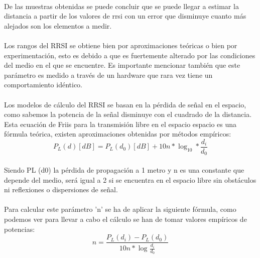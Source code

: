\documentclass[a4paper ,12pt, onecolumn]{article}
\begin{document}
            \paragraph{}
            De las muestras obtenidas se puede concluir que se puede llegar a estimar la distancia a partir de los valores
            de rrsi con un error que disminuye cuanto más alejados son los elementos a medir. 
            \paragraph{}
            Los rangos del RRSI se obtiene bien por aproximaciones teóricas o bien por experimentación, esto es debido a que 
            es fuertemente alterado por las condiciones del medio en el que se encuentre. Es importante mencionar también que
            este parámetro es medido a través de un hardware que rara vez tiene un comportamiento idéntico.
            \paragraph{}
            Los modelos de cálculo del RRSI se basan en la pérdida de señal en el espacio, como sabemos la potencia de la señal
            disminuye con el cuadrado de la distancia. Esta ecuación de Friis para la transmisión libre en el espacio espacio es 
            una fórmula teórica, existen aproximaciones obtenidas por métodos empíricos:
            \begin{equation}
                P_L(d) [dB] = P_L(d_0) [dB] + 10n*\log_{10}* \frac{ d_i }{d_0 } 
            \end{equation}
            \paragraph{}
            Siendo PL (d0)  la pérdida de propagación a 1 metro y n es una constante que depende del medio, será igual
            a 2 si se encuentra en el espacio libre sin obstáculos ni reflexiones o dispersiones de señal.
            \paragraph{}
            Para calcular este parámetro 'n' se ha de aplicar la siguiente fórmula, como podemos ver para llevar a cabo el 
            cálculo se han de tomar valores empíricos de potencias:
            \begin{equation}
                n = \frac{ P_L(d_i) - P_L(d_0) }{10n*\log_{}\frac{d_i}{d_0}}
            \end{equation}
\end{document}
